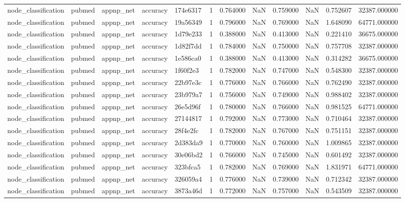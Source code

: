 \begin{tabular}{lllllrrrrrrr}
node_classification & pubmed & appnp_net & accuracy & 174e6317 & 1 & 0.764000 & NaN & 0.759000 & NaN & 0.752607 & 32387.000000 \\
node_classification & pubmed & appnp_net & accuracy & 19a56349 & 1 & 0.796000 & NaN & 0.769000 & NaN & 1.648090 & 64771.000000 \\
node_classification & pubmed & appnp_net & accuracy & 1d79e233 & 1 & 0.388000 & NaN & 0.413000 & NaN & 0.221410 & 36675.000000 \\
node_classification & pubmed & appnp_net & accuracy & 1d82f7dd & 1 & 0.784000 & NaN & 0.750000 & NaN & 0.757708 & 32387.000000 \\
node_classification & pubmed & appnp_net & accuracy & 1e586ca0 & 1 & 0.388000 & NaN & 0.413000 & NaN & 0.314282 & 36675.000000 \\
node_classification & pubmed & appnp_net & accuracy & 1f60f2e3 & 1 & 0.782000 & NaN & 0.747000 & NaN & 0.548300 & 32387.000000 \\
node_classification & pubmed & appnp_net & accuracy & 22b97e3c & 1 & 0.776000 & NaN & 0.766000 & NaN & 0.762490 & 32387.000000 \\
node_classification & pubmed & appnp_net & accuracy & 23b979a7 & 1 & 0.756000 & NaN & 0.749000 & NaN & 0.988402 & 32387.000000 \\
node_classification & pubmed & appnp_net & accuracy & 26e5d96f & 1 & 0.780000 & NaN & 0.766000 & NaN & 0.981525 & 64771.000000 \\
node_classification & pubmed & appnp_net & accuracy & 27144817 & 1 & 0.792000 & NaN & 0.773000 & NaN & 0.710464 & 32387.000000 \\
node_classification & pubmed & appnp_net & accuracy & 28f4e2fc & 1 & 0.782000 & NaN & 0.767000 & NaN & 0.751151 & 32387.000000 \\
node_classification & pubmed & appnp_net & accuracy & 2d383da9 & 1 & 0.770000 & NaN & 0.760000 & NaN & 1.009865 & 32387.000000 \\
node_classification & pubmed & appnp_net & accuracy & 30e06bd2 & 1 & 0.766000 & NaN & 0.745000 & NaN & 0.601492 & 32387.000000 \\
node_classification & pubmed & appnp_net & accuracy & 323bfca5 & 1 & 0.782000 & NaN & 0.769000 & NaN & 1.831971 & 64771.000000 \\
node_classification & pubmed & appnp_net & accuracy & 326059a4 & 1 & 0.776000 & NaN & 0.739000 & NaN & 0.712342 & 32387.000000 \\
node_classification & pubmed & appnp_net & accuracy & 3873a46d & 1 & 0.772000 & NaN & 0.757000 & NaN & 0.543509 & 32387.000000 \\

\end{tabular}
